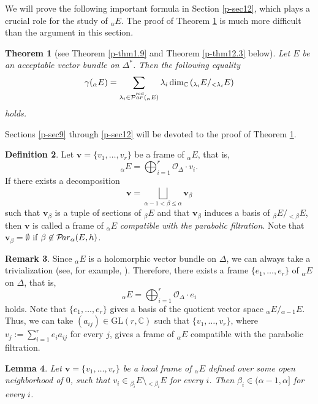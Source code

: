 \documentclass[12pt,twoside]{amsart}
\DeclareMathOperator{\Par}{\mathcal{P}\!\it{ar}}
\DeclareMathOperator{\Parr}{\mathcal{P}{\overset{\mathrm{red}}{\!\it{ar}}}}
\newtheorem{thm}{Theorem}[section]
\newtheorem{lem}[thm]{Lemma}
\theoremstyle{definition}
\newtheorem{defn}[thm]{Definition}
\newtheorem{rem}[thm]{Remark}
\begin{document}
We will prove the following important formula in 
Section \ref{p-sec12}, which plays a crucial role for 
the study of ${}_{\alpha} E$. 
The proof of Theorem \ref{p-thm7.13} is much more difficult than the 
argument in this section. 

\begin{thm}[see Theorem \ref{p-thm1.9} and 
Theorem \ref{p-thm12.3} below]\label{p-thm7.13}
Let $E$ be an acceptable vector bundle on $\Delta^*$. 
Then the following equality 
\[
\gamma ({}_\alpha E)=\sum _{\lambda_i\in \Parr ({}_\alpha E)} 
\lambda_i\dim_\mathbb C \left({}_{\lambda_i} E/{}_{<\lambda_i} E\right)
\] 
holds. 
\end{thm}

Sections \ref{p-sec9} through \ref{p-sec12} will be devoted to the proof of Theorem 
\ref{p-thm7.13}. 

\begin{defn}\label{p-def7.14}
Let $\bm v=\{v_1, \ldots, v_r\}$ be a frame of ${}_\alpha E$, 
that is, 
\[
{}_\alpha E=\bigoplus _{i=1}^r\mathcal O_\Delta\cdot v_i. 
\] 
If there exists a decomposition 
\[
\bm v=\bigsqcup _{\alpha -1< \beta\leq \alpha}\bm v_{\beta}
\] 
such that $\bm v_\beta$ is a tuple of sections of ${}_\beta E$ 
and that $\bm v_\beta$ induces a basis of ${}_\beta E/{}_{<\beta} E$, then 
$\bm v$ is called a frame of ${}_\alpha E$ 
{\em{compatible with the parabolic filtration}}. 
Note that $\bm v_\beta=\emptyset$ if $\beta \not \in \Par _{\alpha} (E, h)$. 
\end{defn}

\begin{rem}\label{p-rem7.15}
Since ${}_\alpha E$ is a holomorphic vector bundle on $\Delta$, we can 
always take a trivialization (see, for example, \cite[30.4.~Theorem]{forster}). 
Therefore, 
there exists a frame $\{e_1, \ldots, e_r \}$ of ${}_\alpha E$ on $\Delta$, 
that is, 
\[
{}_\alpha E= \bigoplus _{i=1} ^r \mathcal O_{\Delta} \cdot e_i 
\] 
holds. Note that $\{e_1, \ldots, e_r\}$ gives a 
basis of the quotient vector space ${}_\alpha E /{}_{\alpha-1}E$. 
Thus, we can take $(a_{ij})\in \mathrm{GL}(r, \mathbb C)$ such that 
$\{v_1, \ldots, v_r\}$, where 
$v_j :=\sum _{i=1} ^r e_i a_{ij}$ for every $j$, 
gives a frame of ${}_\alpha E$ compatible with 
the parabolic filtration. 
\end{rem}

\begin{lem}\label{p-lem7.16}
Let $\bm v = \{v_1, \ldots, v_r\}$ be a local frame 
of ${}_\alpha E$ defined over some open neighborhood 
of $0$, such that 
$v_i \in {}_{\beta_i}E \setminus {}_{<\beta_i} E$ for every $i$. 
Then $\beta_i \in (\alpha -1, \alpha]$ for every $i$. 
\end{lem}
\end{document}
